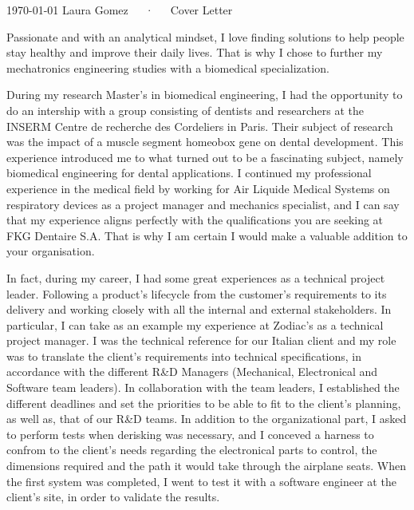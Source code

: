 \documentclass[11pt, a4paper]{awesome-cv}
\begin{document}
\makecvheader[R]

\makecvfooter
  {\today}
  {Laura Gomez~~~·~~~Cover Letter}
  {}

\makelettertitle

\begin{cvletter}


Passionate and with an analytical mindset, I love finding solutions to help people stay healthy and improve their daily lives.
That is why I chose to further my mechatronics engineering studies with a biomedical specialization. 

During my research Master's in biomedical engineering, I had the opportunity to do an intership with a group consisting of dentists and researchers at the INSERM Centre de recherche des Cordeliers in Paris. 
Their subject of research was the impact of a muscle segment homeobox gene on dental development. 
This experience introduced me to what turned out to be a fascinating subject, namely biomedical engineering for dental applications. I continued my professional experience in the medical field by working for Air Liquide Medical Systems on respiratory devices as a project manager and mechanics specialist, 
and I can say that my experience aligns perfectly with the qualifications you are seeking at FKG Dentaire S.A.
That is why I am certain I would make a valuable addition to your organisation.

In fact, during my career, I had some great experiences as a technical project leader. 
Following a product's lifecycle from the customer's requirements to its delivery and working closely with all the internal and external stakeholders.
In particular, I can take as an example my experience at Zodiac's as a technical project manager. 
I was the technical reference for our Italian client and my role was to translate the client's requirements into technical specifications, in accordance with the different R\&D Managers (Mechanical, Electronical and Software team leaders).
In collaboration with the team leaders, I established the different deadlines and set the priorities to be able to fit to the client's planning, as well as, that of our R\&D teams.
In addition to the organizational part, I asked to perform tests when derisking was necessary, and I conceved a harness to confrom to the client's needs regarding the electronical parts to control, the dimensions required and the path it would take through the airplane seats.
When the first system was completed, I went to test it with a software engineer at the client's site, in order to validate the results.


\end{cvletter}
\end{document}
